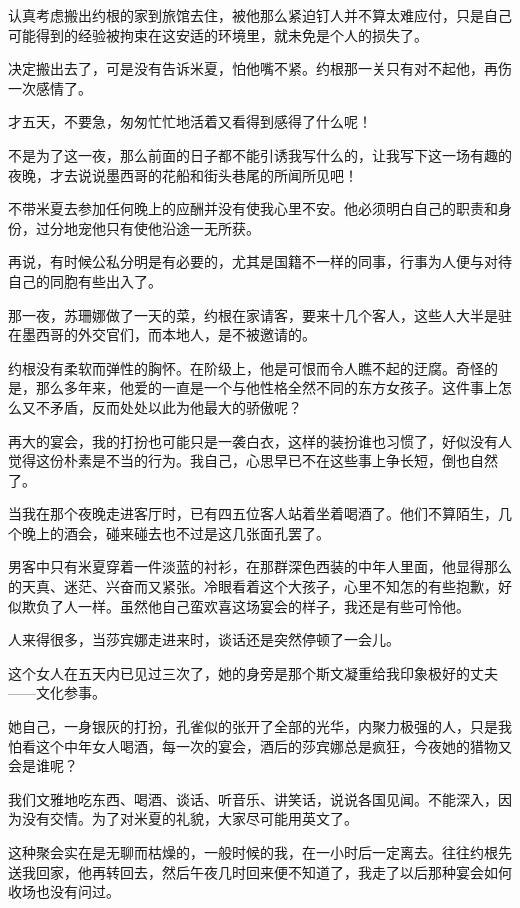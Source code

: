 \par 认真考虑搬出约根的家到旅馆去住，被他那么紧迫钉人并不算太难应付，只是自己可能得到的经验被拘束在这安适的环境里，就未免是个人的损失了。
\par 决定搬出去了，可是没有告诉米夏，怕他嘴不紧。约根那一关只有对不起他，再伤一次感情了。
\par 才五天，不要急，匆匆忙忙地活着又看得到感得了什么呢！
\par 
\par 不是为了这一夜，那么前面的日子都不能引诱我写什么的，让我写下这一场有趣的夜晚，才去说说墨西哥的花船和街头巷尾的所闻所见吧！
\par 不带米夏去参加任何晚上的应酬并没有使我心里不安。他必须明白自己的职责和身份，过分地宠他只有使他沿途一无所获。
\par 再说，有时候公私分明是有必要的，尤其是国籍不一样的同事，行事为人便与对待自己的同胞有些出入了。
\par 
\par 那一夜，苏珊娜做了一天的菜，约根在家请客，要来十几个客人，这些人大半是驻在墨西哥的外交官们，而本地人，是不被邀请的。
\par 约根没有柔软而弹性的胸怀。在阶级上，他是可恨而令人瞧不起的迂腐。奇怪的是，那么多年来，他爱的一直是一个与他性格全然不同的东方女孩子。这件事上怎么又不矛盾，反而处处以此为他最大的骄傲呢？
\par 再大的宴会，我的打扮也可能只是一袭白衣，这样的装扮谁也习惯了，好似没有人觉得这份朴素是不当的行为。我自己，心思早已不在这些事上争长短，倒也自然了。
\par 当我在那个夜晚走进客厅时，已有四五位客人站着坐着喝酒了。他们不算陌生，几个晚上的酒会，碰来碰去也不过是这几张面孔罢了。
\par 男客中只有米夏穿着一件淡蓝的衬衫，在那群深色西装的中年人里面，他显得那么的天真、迷茫、兴奋而又紧张。冷眼看着这个大孩子，心里不知怎的有些抱歉，好似欺负了人一样。虽然他自己蛮欢喜这场宴会的样子，我还是有些可怜他。
\par 人来得很多，当莎宾娜走进来时，谈话还是突然停顿了一会儿。
\par 这个女人在五天内已见过三次了，她的身旁是那个斯文凝重给我印象极好的丈夫——文化参事。
\par 她自己，一身银灰的打扮，孔雀似的张开了全部的光华，内聚力极强的人，只是我怕看这个中年女人喝酒，每一次的宴会，酒后的莎宾娜总是疯狂，今夜她的猎物又会是谁呢？
\par 我们文雅地吃东西、喝酒、谈话、听音乐、讲笑话，说说各国见闻。不能深入，因为没有交情。为了对米夏的礼貌，大家尽可能用英文了。
\par 这种聚会实在是无聊而枯燥的，一般时候的我，在一小时后一定离去。往往约根先送我回家，他再转回去，然后午夜几时回来便不知道了，我走了以后那种宴会如何收场也没有问过。
